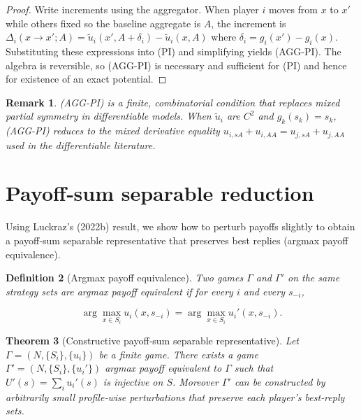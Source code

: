 \documentclass[11pt]{article}
\newtheorem{theorem}{Theorem}[section]
\newtheorem{definition}[theorem]{Definition}
\newtheorem{remark}[theorem]{Remark}
\begin{document}
\begin{proof}
Write increments using the aggregator. When player \(i\) moves from \(x\) to
\(x'\) while others fixed so the baseline aggregate is \(A\), the increment
is \(\Delta_i(x\to x';A)=\tilde u_i(x',A+\delta_i)-\tilde u_i(x,A)\) where
\(\delta_i=g_i(x')-g_i(x)\). Substituting these expressions into (PI) and
simplifying yields (AGG-PI). The algebra is reversible, so (AGG-PI) is
necessary and sufficient for (PI) and hence for existence of an exact
potential.
\end{proof}

\begin{remark}
(AGG-PI) is a finite, combinatorial condition that replaces mixed partial
symmetry in differentiable models. When \(\tilde u_i\) are \(C^2\) and
\(g_k(s_k)=s_k\), (AGG-PI) reduces to the mixed derivative equality
\(u_{i,sA}+u_{i,AA}=u_{j,sA}+u_{j,AA}\) used in the differentiable literature.
\end{remark}

\section{Payoff‑sum separable reduction}
Using Luckraz's (2022b) result, we show how to perturb payoffs slightly to obtain a payoff‑sum separable
representative that preserves best replies (argmax payoff equivalence).

\begin{definition}[Argmax payoff equivalence]
Two games \(\Gamma\) and \(\Gamma'\) on the same strategy sets are
\emph{argmax payoff equivalent} if for every \(i\) and every \(s_{-i}\),


\[
\arg\max_{x\in S_i} u_i(x,s_{-i})=\arg\max_{x\in S_i} u_i'(x,s_{-i}).
\]


\end{definition}

\begin{theorem}[Constructive payoff‑sum separable representative]
\label{thm:perturb}
Let \(\Gamma=(N,\{S_i\},\{u_i\})\) be a finite game. There exists a game
\(\Gamma'=(N,\{S_i\},\{u_i'\})\) argmax payoff equivalent to \(\Gamma\) such
that \(U'(s)=\sum_i u_i'(s)\) is injective on \(S\). Moreover \(\Gamma'\)
can be constructed by arbitrarily small profile‑wise perturbations that
preserve each player's best‑reply sets.
\end{theorem}
\end{document}
